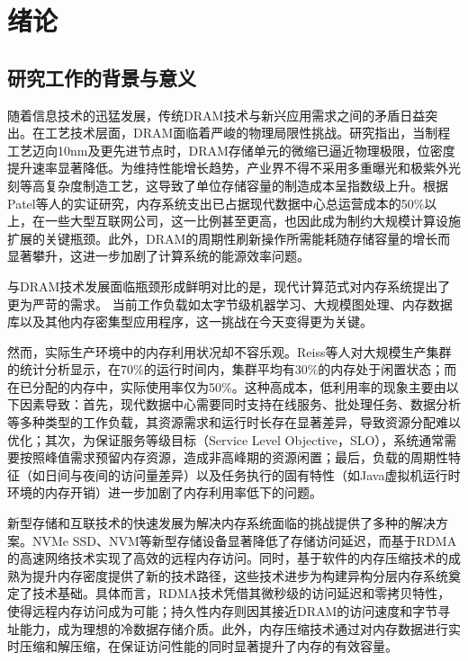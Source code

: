 \chapter{绪\hspace{6pt}论}



\section{研究工作的背景与意义}

随着信息技术的迅猛发展，传统DRAM技术与新兴应用需求之间的矛盾日益突出。在工艺技术层面，DRAM面临着严峻的物理局限性挑战。研究指出，当制程工艺迈向10nm及更先进节点时，DRAM存储单元的微缩已逼近物理极限，位密度提升速率显著降低。为维持性能增长趋势，产业界不得不采用多重曝光和极紫外光刻等高复杂度制造工艺，这导致了单位存储容量的制造成本呈指数级上升。根据Patel等人的实证研究，内存系统支出已占据现代数据中心总运营成本的50\%以上，在一些大型互联网公司，这一比例甚至更高，也因此成为制约大规模计算设施扩展的关键瓶颈。此外，DRAM的周期性刷新操作所需能耗随存储容量的增长而显著攀升，这进一步加剧了计算系统的能源效率问题。

与DRAM技术发展面临瓶颈形成鲜明对比的是，现代计算范式对内存系统提出了更为严苛的需求。
当前工作负载如太字节级机器学习、大规模图处理、内存数据库以及其他内存密集型应用程序，这一挑战在今天变得更为关键。


然而，实际生产环境中的内存利用状况却不容乐观。Reiss等人对大规模生产集群的统计分析显示，在70\%的运行时间内，集群平均有30\%的内存处于闲置状态；而在已分配的内存中，实际使用率仅为50\%。这种高成本，低利用率的现象主要由以下因素导致：首先，现代数据中心需要同时支持在线服务、批处理任务、数据分析等多种类型的工作负载，其资源需求和运行时长存在显著差异，导致资源分配难以优化；其次，为保证服务等级目标（Service Level Objective，SLO），系统通常需要按照峰值需求预留内存资源，造成非高峰期的资源闲置；最后，负载的周期性特征（如日间与夜间的访问量差异）以及任务执行的固有特性（如Java虚拟机运行时环境的内存开销）进一步加剧了内存利用率低下的问题。

新型存储和互联技术的快速发展为解决内存系统面临的挑战提供了多种的解决方案。NVMe SSD、NVM等新型存储设备显著降低了存储访问延迟，而基于RDMA的高速网络技术实现了高效的远程内存访问。同时，基于软件的内存压缩技术的成熟为提升内存密度提供了新的技术路径，这些技术进步为构建异构分层内存系统奠定了技术基础。具体而言，RDMA技术凭借其微秒级的访问延迟和零拷贝特性，使得远程内存访问成为可能；持久性内存则因其接近DRAM的访问速度和字节寻址能力，成为理想的冷数据存储介质。此外，内存压缩技术通过对内存数据进行实时压缩和解压缩，在保证访问性能的同时显著提升了内存的有效容量。

